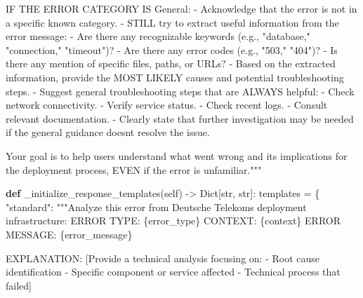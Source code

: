 \documentclass[
  a4paper,
  12pt,
  oneside,
  open=any,
  BCOR=12mm,
  DIV=14,
  parskip=half*,
  headsepline,
  footsepline,
  pointlessnumbers,
  liststotoc,
  numbers=noenddot,
  listof=totoc]{scrartcl}
\newenvironment{Shaded}{\begin{snugshade}}{\end{snugshade}}
\newcommand{\BuiltInTok}[1]{\textcolor[rgb]{0.00,0.23,0.31}{#1}}
\newcommand{\KeywordTok}[1]{\textcolor[rgb]{0.00,0.23,0.31}{\textbf{#1}}}
\newcommand{\NormalTok}[1]{\textcolor[rgb]{0.00,0.23,0.31}{#1}}
\newcommand{\OperatorTok}[1]{\textcolor[rgb]{0.37,0.37,0.37}{#1}}
\newcommand{\SpecialCharTok}[1]{\textcolor[rgb]{0.37,0.37,0.37}{#1}}
\newcommand{\StringTok}[1]{\textcolor[rgb]{0.13,0.47,0.30}{#1}}
\newcommand{\VariableTok}[1]{\textcolor[rgb]{0.07,0.07,0.07}{#1}}
\begin{document}
\begin{Shaded}
\begin{Highlighting}[]
\StringTok{            IF THE ERROR CATEGORY IS \textquotesingle{}General\textquotesingle{}:}
\StringTok{            {-} Acknowledge that the error is not in a specific }
\StringTok{            known category.}
\StringTok{            {-} STILL try to extract useful information from the }
\StringTok{            error message:}
\StringTok{                {-} Are there any recognizable keywords }
\StringTok{                (e.g., "database," "connection," "timeout")?}
\StringTok{                {-} Are there any error codes (e.g., "503," "404")?}
\StringTok{                {-} Is there any mention of specific files, paths, }
\StringTok{                or URLs?}
\StringTok{            {-} Based on the extracted information, provide the }
\StringTok{            MOST LIKELY causes and potential troubleshooting steps.}
\StringTok{            {-} Suggest general troubleshooting steps that are }
\StringTok{            ALWAYS helpful:}
\StringTok{                {-} Check network connectivity.}
\StringTok{                {-} Verify service status.}
\StringTok{                {-} Check recent logs.}
\StringTok{                {-} Consult relevant documentation.}
\StringTok{            {-} Clearly state that further investigation may }
\StringTok{            be needed if the general guidance doesn\textquotesingle{}t }
\StringTok{            resolve the issue.}

\StringTok{            Your goal is to help users understand what went wrong }
\StringTok{            and its implications for the deployment process, }
\StringTok{            EVEN if the error is unfamiliar."""}

    \KeywordTok{def}\NormalTok{ \_initialize\_response\_templates(}\VariableTok{self}\NormalTok{) }\OperatorTok{{-}\textgreater{}}\NormalTok{ Dict[}\BuiltInTok{str}\NormalTok{, }\BuiltInTok{str}\NormalTok{]:}
\NormalTok{        templates }\OperatorTok{=}\NormalTok{ \{}
            \StringTok{"standard"}\NormalTok{: }\StringTok{"""Analyze this error from Deutsche }
\StringTok{                           Telekom\textquotesingle{}s deployment infrastructure:}
\StringTok{            ERROR TYPE: }\SpecialCharTok{\{error\_type\}}
\StringTok{            CONTEXT: }\SpecialCharTok{\{context\}}
\StringTok{            ERROR MESSAGE:}
\StringTok{            }\SpecialCharTok{\{error\_message\}}

\StringTok{            EXPLANATION:}
\StringTok{            [Provide a technical analysis focusing on:}
\StringTok{            {-} Root cause identification}
\StringTok{            {-} Specific component or service affected}
\StringTok{            {-} Technical process that failed]}


\end{Highlighting}
\end{Shaded}
\end{document}
